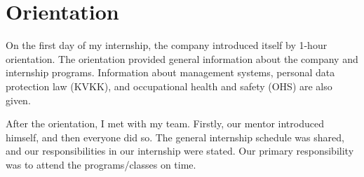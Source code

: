 \section{Orientation}

On the first day of my internship, the company introduced itself by 1-hour orientation. The orientation provided general information about the company and internship programs. Information about management systems, personal data protection law (KVKK), and occupational health and safety (OHS) are also given.

After the orientation, I met with my team. Firstly, our mentor introduced himself, and then everyone did so. The general internship schedule was shared, and our responsibilities in our internship were stated. Our primary responsibility was to attend the programs/classes on time.
